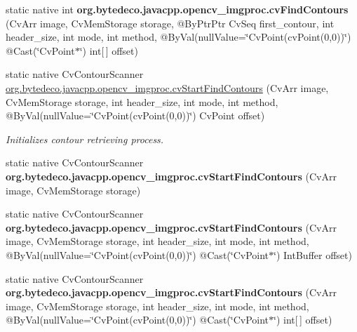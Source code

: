 \begin{DoxyCompactItemize}
\item 
\mbox{\label{group__imgproc__c_gafffa97bdbc94b4d59293006d3792bcf3}} 
static native int {\bfseries org.\+bytedeco.\+javacpp.\+opencv\+\_\+imgproc.\+cv\+Find\+Contours} (Cv\+Arr image, Cv\+Mem\+Storage storage, @By\+Ptr\+Ptr Cv\+Seq first\+\_\+contour, int header\+\_\+size, int mode, int method, @By\+Val(null\+Value=\char`\"{}Cv\+Point(cv\+Point(0,0))\char`\"{}) @Cast(\char`\"{}Cv\+Point$\ast$\char`\"{}) int\mbox{[}$\,$\mbox{]} offset)
\item 
static native Cv\+Contour\+Scanner \hyperlink{group__imgproc__c_ga17ceae2468b1b23ece917fb982a377ff}{org.\+bytedeco.\+javacpp.\+opencv\+\_\+imgproc.\+cv\+Start\+Find\+Contours} (Cv\+Arr image, Cv\+Mem\+Storage storage, int header\+\_\+size, int mode, int method, @By\+Val(null\+Value=\char`\"{}Cv\+Point(cv\+Point(0,0))\char`\"{}) Cv\+Point offset)
\begin{DoxyCompactList}\small\item\em Initializes contour retrieving process. \end{DoxyCompactList}\item 
\mbox{\label{group__imgproc__c_gafccb8516a9f16f254c892baa973a70d5}} 
static native Cv\+Contour\+Scanner {\bfseries org.\+bytedeco.\+javacpp.\+opencv\+\_\+imgproc.\+cv\+Start\+Find\+Contours} (Cv\+Arr image, Cv\+Mem\+Storage storage)
\item 
\mbox{\label{group__imgproc__c_gab16f82b52d562c5b2833e8f391c8435f}} 
static native Cv\+Contour\+Scanner {\bfseries org.\+bytedeco.\+javacpp.\+opencv\+\_\+imgproc.\+cv\+Start\+Find\+Contours} (Cv\+Arr image, Cv\+Mem\+Storage storage, int header\+\_\+size, int mode, int method, @By\+Val(null\+Value=\char`\"{}Cv\+Point(cv\+Point(0,0))\char`\"{}) @Cast(\char`\"{}Cv\+Point$\ast$\char`\"{}) Int\+Buffer offset)
\item 
\mbox{\label{group__imgproc__c_ga5b6eb27065036cc42c2cbececd69b3d3}} 
static native Cv\+Contour\+Scanner {\bfseries org.\+bytedeco.\+javacpp.\+opencv\+\_\+imgproc.\+cv\+Start\+Find\+Contours} (Cv\+Arr image, Cv\+Mem\+Storage storage, int header\+\_\+size, int mode, int method, @By\+Val(null\+Value=\char`\"{}Cv\+Point(cv\+Point(0,0))\char`\"{}) @Cast(\char`\"{}Cv\+Point$\ast$\char`\"{}) int\mbox{[}$\,$\mbox{]} offset)
\item 

\end{DoxyCompactItemize}
